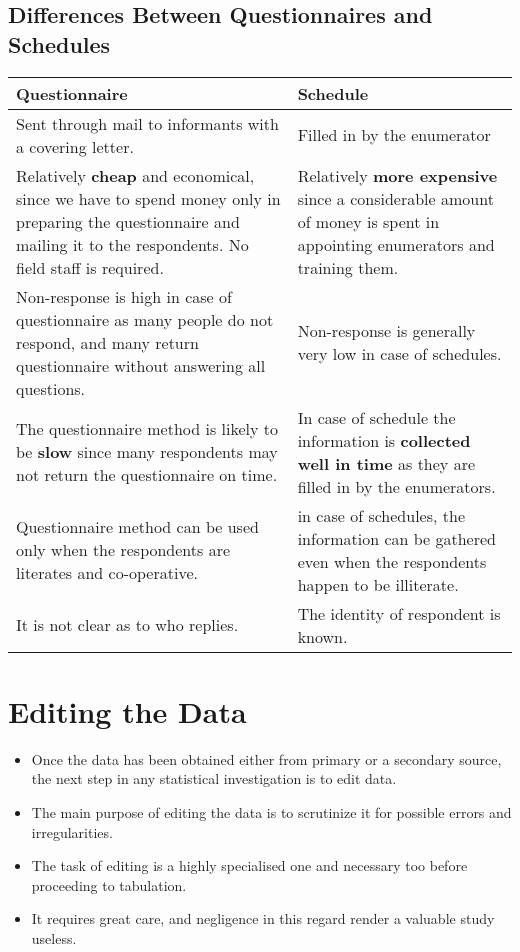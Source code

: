 \documentclass[
10pt, %
a4paper, %
]{report}
\begin{document}
\subsection*{Differences Between Questionnaires and Schedules}
\begin{center}
\centering
\begin{tabular}{| p{} | p{} |}
\hline
Questionnaire & Schedule \\
\hline \hline 
Sent through mail to informants with a covering letter. & Filled in by the enumerator \\
\hline
Relatively \textbf{cheap} and economical, since we have to spend money only in preparing the questionnaire and mailing it to the respondents. No field staff is required. & Relatively \textbf{more expensive} since a considerable amount of money is spent in appointing enumerators and training them. \\
\hline
Non-response is high in case of questionnaire as many people do not respond, and many return questionnaire without answering all questions. & Non-response is generally very low in case of schedules. \\
\hline
The questionnaire method is likely to be \textbf{slow} since many respondents may not return the questionnaire on time. &
In case of schedule the information is \textbf{collected well in time} as they are filled in by the enumerators. \\
\hline
Questionnaire method can be used only when the respondents are literates and co-operative. & in case of schedules, the information can be gathered even when the respondents happen to be illiterate. \\
\hline
It is not clear as to who replies. & The identity of respondent is known. \\
\hline
\end{tabular}
\end{center}

\section*{Editing the Data}
\begin{itemize}
\item Once the data has been obtained either from primary or a
secondary source, the next step in any statistical investigation
is to edit data.
\item The main purpose of editing the data is to scrutinize it for
possible errors and irregularities.
\item The task of editing is a highly specialised one and necessary
too before proceeding to tabulation.
\item It requires great care, and negligence in this regard render a valuable study useless.
\end{itemize}
\end{document}
